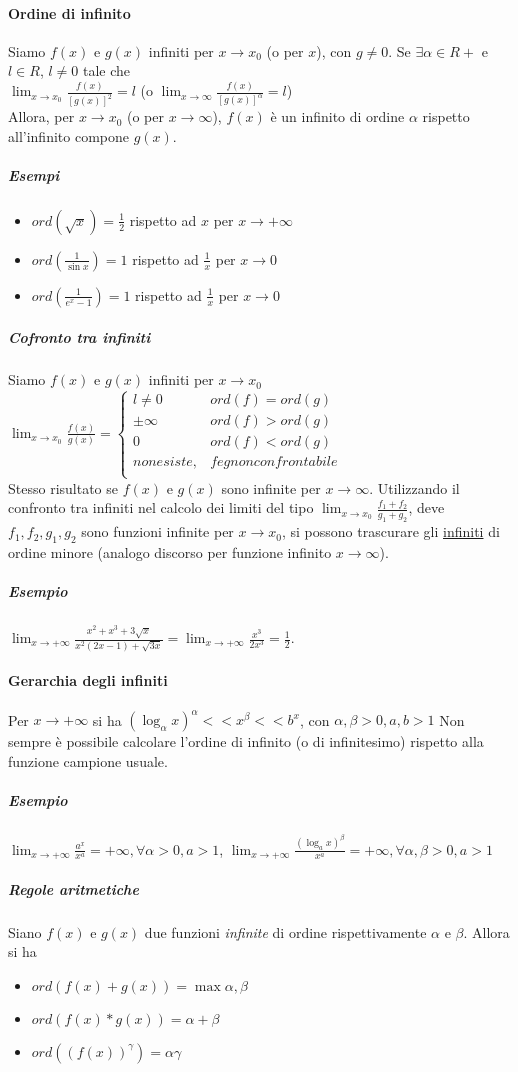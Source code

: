 \documentclass{book}
\begin{document}
\paragraph{Ordine di infinito}
Siamo $f(x)$ e $g(x)$ infiniti per $x\to x_0$ (o per $x$), con $g\neq 0$. Se $\exists\alpha\in R+$ e $l\in R$, $l\neq 0$ tale che\\
$\lim_{x\to x_0}\frac{f(x)}{[g(x)]^2}=l$ (o $\lim_{x\to \infty}\frac{f(x)}{[g(x)]^\alpha}=l$)\\
Allora, per $x\to x_0$ (o per $x\to \infty$), $f(x)$ è un infinito di ordine $\alpha$ rispetto all'infinito compone $g(x)$.
\subparagraph{Esempi}
\begin{itemize}
	\item $ord(\sqrt{x})=\frac{1}{2}$ rispetto ad $x$ per $x\to +\infty$
	\item $ord(\frac{1}{\sin x})=1$ rispetto ad $\frac{1}{x}$ per $x\to 0$
	\item $ord(\frac{1}{e^x-1})=1$ rispetto ad $\frac{1}{x}$ per $x\to 0$
\end{itemize}
\subparagraph{Cofronto tra infiniti}
Siamo $f(x)$ e $g(x)$ infiniti per $x\to x_0$\\
$\lim_{x\to x_0}\frac{f(x)}{g(x)}=\begin{cases}
l\neq 0&ord(f)=ord(g)\\
\pm \infty&ord(f)>ord(g)\\
0&ord(f)<ord(g)\\
non esiste, & f e g non confrontabile \\ 
\end{cases}
$\\
Stesso risultato se $f(x)$ e $g(x)$ sono infinite per $x \to \infty$. Utilizzando il confronto tra infiniti nel calcolo dei limiti del tipo $\lim_{x\to x_0}\frac{f_1+f_2}{g_1+g_2}$, deve $f_1,f_2,g_1,g_2$ sono funzioni infinite per $x\to x_0$, si possono {\color{red}trascurare gli \underline{infiniti} di ordine minore} (analogo discorso per funzione infinito $x\to \infty$).
\subparagraph{Esempio}
$\lim_{x\to +\infty}\frac{x^2+x^3+3\sqrt{x}}{x^2(2x-1)+\sqrt{3x}}=\lim_{x\to +\infty}\frac{x^3}{2x^3}=\frac{1}{2}$.
\paragraph{Gerarchia degli infiniti}
Per $x\to +\infty$ si ha $(\log_\alpha x)^\alpha<<x^\beta<<b^x$, con $\alpha,\beta>0,a,b>1$ Non sempre è possibile calcolare l'ordine di infinito (o di infinitesimo) rispetto alla funzione campione usuale.\\
\subparagraph{Esempio}
$\lim_{x\to +\infty}\frac{a^x}{x^a}=+\infty, \forall \alpha>0, a>1$, $\lim_{x\to +\infty}\frac{(\log_a x)^\beta}{x^a}=+\infty, \forall \alpha, \beta>0, a>1$
\subparagraph{Regole aritmetiche}
Siano $f(x)$ e $g(x)$ due funzioni \emph{infinite} di ordine rispettivamente $\alpha$ e $\beta$. Allora si ha
\begin{itemize}
	\item $ord(f(x)+g(x))=\max{\alpha,\beta}$
	\item $ord(f(x)*g(x))=\alpha+\beta$
	\item $ord((f(x))^\gamma)=\alpha\gamma$
\end{itemize}
\end{document}
